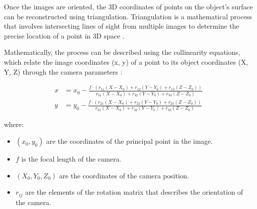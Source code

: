 \documentclass[12pt,a4paper,oneside]{report}
\begin{document}
Once the images are oriented, the 3D coordinates of points on the object's surface 
can be reconstructed using triangulation. Triangulation is a mathematical process 
that involves intersecting lines of sight from multiple images to determine the 
precise location of a point in 3D space
\cite{hartleyMultipleViewGeometry2003,furukawaAccurateDenseRobust2010}.

Mathematically, the process can be described using the collinearity equations, which 
relate the image coordinates (x, y) of a point to its object coordinates (X, Y, Z) 
through the camera parameters
\cite{wolfElementsPhotogrammetryApplication2013,krausPhotogrammetryGeometryImages2007}:

\[
\begin{aligned}
    x &= x_0 - \frac{f \cdot (r_{11}(X - X_0) + r_{12}(Y - Y_0) + r_{13}(Z - Z_0))}{r_{31}(X - X_0) + r_{32}(Y - Y_0) + r_{33}(Z - Z_0)} \\
    y &= y_0 - \frac{f \cdot (r_{21}(X - X_0) + r_{22}(Y - Y_0) + r_{23}(Z - Z_0))}{r_{31}(X - X_0) + r_{32}(Y - Y_0) + r_{33}(Z - Z_0)}
\end{aligned}
\]

where:
\begin{itemize}
    \item \( (x_0, y_0) \) are the coordinates of the principal point in the image.
    \item \( f \) is the focal length of the camera.
    \item \( (X_0, Y_0, Z_0) \) are the coordinates of the camera position.
    \item \( r_{ij} \) are the elements of the rotation matrix that describes the orientation of the camera.
\end{itemize}
\end{document}
